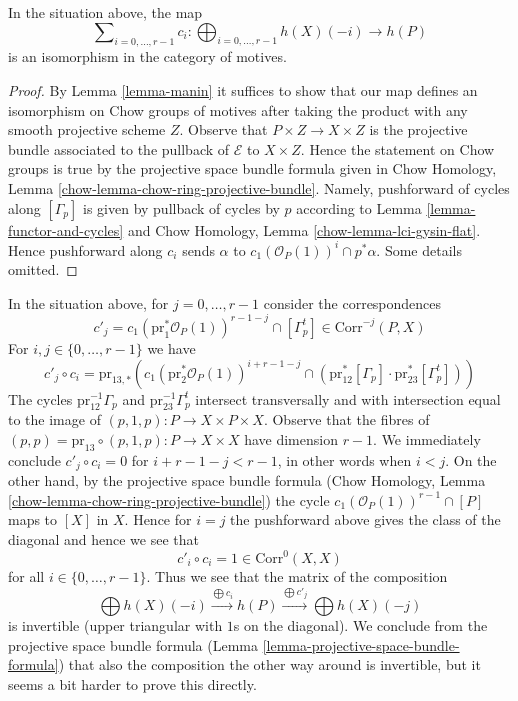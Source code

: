 \begin{lemma}
\label{lemma-projective-space-bundle-formula}
In the situation above, the map
$$
\sum\nolimits_{i = 0, \ldots, r - 1} c_i :
\bigoplus\nolimits_{i = 0, \ldots, r - 1} h(X)(-i)
\longrightarrow
h(P)
$$
is an isomorphism in the category of motives.
\end{lemma}

\begin{proof}
By Lemma \ref{lemma-manin} it suffices to show that
our map defines an isomorphism on Chow groups of motives
after taking the product with any smooth projective scheme $Z$.
Observe that $P \times Z \to X \times Z$ is the projective
bundle associated to the pullback of $\mathcal{E}$ to $X \times Z$.
Hence the statement on Chow groups is true by the projective space bundle
formula given in
Chow Homology, Lemma \ref{chow-lemma-chow-ring-projective-bundle}.
Namely, pushforward of cycles along $[\Gamma_p]$ is given by pullback
of cycles by $p$ according to Lemma \ref{lemma-functor-and-cycles} and
Chow Homology, Lemma \ref{chow-lemma-lci-gysin-flat}. Hence pushforward
along $c_i$ sends $\alpha$ to $c_1(\mathcal{O}_P(1))^i \cap p^*\alpha$.
Some details omitted.
\end{proof}

\noindent
In the situation above, for $j = 0, \ldots, r - 1$ consider
the correspondences
$$
c'_j = c_1(\text{pr}_1^*\mathcal{O}_P(1))^{r - 1 - j} \cap [\Gamma_p^t] \in
\text{Corr}^{-j}(P, X)
$$
For $i, j \in \{0, \ldots, r - 1\}$ we have
$$
c'_j \circ c_i =
\text{pr}_{13, *}\left(
c_1(\text{pr}_2^*\mathcal{O}_P(1))^{i + r - 1 - j} \cap
(\text{pr}_{12}^*[\Gamma_p] \cdot \text{pr}_{23}^*[\Gamma_p^t])
\right)
$$
The cycles $\text{pr}_{12}^{-1}\Gamma_p$ and 
$\text{pr}_{23}^{-1}\Gamma_p^t$ intersect transversally and
with intersection equal to the image of
$(p, 1, p) : P \to X \times P \times X$.
Observe that the fibres of
$(p, p) = \text{pr}_{13} \circ (p, 1, p) : P \to X \times X$
have dimension $r - 1$. We immediately conclude
$c'_j \circ c_i = 0$ for $i + r - 1 - j < r - 1$, in other words when $i < j$.
On the other hand, by the projective space bundle formula
(Chow Homology, Lemma \ref{chow-lemma-chow-ring-projective-bundle})
the cycle $c_1(\mathcal{O}_P(1))^{r - 1} \cap [P]$ maps
to $[X]$ in $X$. Hence for $i = j$ the pushforward above
gives the class of the diagonal and hence
we see that
$$
c'_i \circ c_i = 1 \in \text{Corr}^0(X, X)
$$
for all $i \in \{0, \ldots, r - 1\}$. Thus we see that the matrix
of the composition
$$
\bigoplus h(X)(-i)
\xrightarrow{\bigoplus c_i}
h(P)
\xrightarrow{\bigoplus c'_j}
\bigoplus h(X)(-j)
$$
is invertible (upper triangular with $1$s on the diagonal).
We conclude from the projective space bundle formula
(Lemma \ref{lemma-projective-space-bundle-formula})
that also the composition the other way around is
invertible, but it seems a bit harder to prove this directly.

